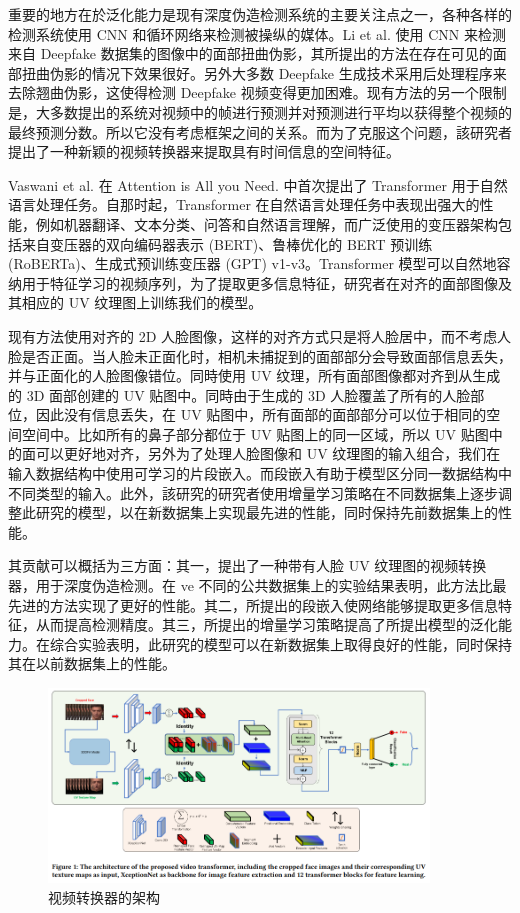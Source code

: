 重要的地方在於泛化能力是现有深度伪造检测系统的主要关注点之一，各种各样的检测系统使用 CNN 和循环网络来检测被操纵的媒体。Li et al. 使用 CNN 来检测来自 Deepfake 数据集的图像中的面部扭曲伪影，其所提出的方法在存在可见的面部扭曲伪影的情况下效果很好。另外大多数 Deepfake 生成技术采用后处理程序来去除翘曲伪影，这使得检测 Deepfake 视频变得更加困难。现有方法的另一个限制是，大多数提出的系统对视频中的帧进行预测并对预测进行平均以获得整个视频的最终预测分数。所以它没有考虑框架之间的关系。而为了克服这个问题，該研究者提出了一种新颖的视频转换器来提取具有时间信息的空间特征。

Vaswani et al. 在  Attention is All you Need. 中首次提出了 Transformer 用于自然语言处理任务。自那时起，Transformer 在自然语言处理任务中表现出强大的性能，例如机器翻译、文本分类、问答和自然语言理解，而广泛使用的变压器架构包括来自变压器的双向编码器表示 (BERT)、鲁棒优化的 BERT 预训练 (RoBERTa)、生成式预训练变压器 (GPT) v1-v3。Transformer 模型可以自然地容纳用于特征学习的视频序列，为了提取更多信息特征，研究者在对齐的面部图像及其相应的 UV 纹理图上训练我们的模型。

现有方法使用对齐的 2D 人脸图像，这样的对齐方式只是将人脸居中，而不考虑人脸是否正面。当人脸未正面化时，相机未捕捉到的面部部分会导致面部信息丢失，并与正面化的人脸图像错位。同時使用 UV 纹理，所有面部图像都对齐到从生成的 3D 面部创建的 UV 贴图中。同時由于生成的 3D 人脸覆盖了所有的人脸部位，因此没有信息丢失，在 UV 贴图中，所有面部的面部部分可以位于相同的空间空间中。比如所有的鼻子部分都位于 UV 贴图上的同一区域，所以 UV 贴图中的面可以更好地对齐，另外为了处理人脸图像和 UV 纹理图的输入组合，我们在输入数据结构中使用可学习的片段嵌入。而段嵌入有助于模型区分同一数据结构中不同类型的输入。此外，該研究的研究者使用增量学习策略在不同数据集上逐步调整此研究的模型，以在新数据集上实现最先进的性能，同时保持先前数据集上的性能。

其贡献可以概括为三方面：其一，提出了一种带有人脸 UV 纹理图的视频转换器，用于深度伪造检测。在 ve 不同的公共数据集上的实验结果表明，此方法比最先进的方法实现了更好的性能。其二，所提出的段嵌入使网络能够提取更多信息特征，从而提高检测精度。其三，所提出的增量学习策略提高了所提出模型的泛化能力。在综合实验表明，此研究的模型可以在新数据集上取得良好的性能，同时保持其在以前数据集上的性能。

\begin{figure}[htb]
\centering 
\includegraphics[width=0.90\textwidth]{img/p3m1.png} 
\caption{视频转换器的架构}
\label{Test}
\end{figure}

